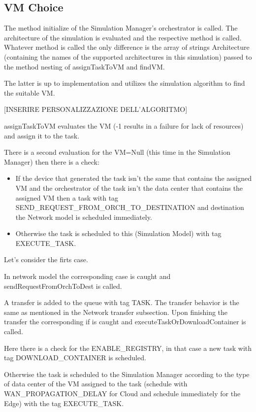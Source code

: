 \documentclass[12pt]{report}
\begin{document}
\subsection*{VM Choice}
The method initialize of the Simulation Manager's orchestrator is called. The architecture of the simulation is evaluated and the respective method is called. Whatever method is called the only difference is the array of strings Architecture (containing the names of the supported architectures in this simulation) passed to the method nesting of assignTaskToVM and findVM.

The latter is up to implementation and utilizes the simulation algorithm to find the suitable VM.

[INSERIRE PERSONALIZZAZIONE DELL'ALGORITMO]

assignTaskToVM evaluates the VM (-1 results in a failure for lack of resources) and assign it to the task. 

\vspace{0.5cm}
There is a second evaluation for the VM=Null (this time in the Simulation Manager) then there is a check:
\begin{itemize}
	\item If the device that generated the task isn't the same that contains the assigned VM and the orchestrator of the task isn't the data center that contains the assigned VM then a task with tag SEND\_REQUEST\_FROM\_ORCH\_TO\_DESTINATION and destination the Network model is scheduled immediately.
	\item Otherwise the task is scheduled to this (Simulation Model) with tag EXECUTE\_TASK.
\end{itemize}
Let's consider the firts case.

In network model the corresponding case is caught and sendRequestFromOrchToDest is called.

A transfer is added to the queue with tag TASK. The transfer behavior is the same as mentioned in the Network transfer subsection. %
Upon finishing the transfer the corresponding if is caught and executeTaskOrDownloadContainer is called.

Here there is a check for the ENABLE\_REGISTRY, in that case a new task with tag DOWNLOAD\_CONTAINER is scheduled.

Otherwise the task is scheduled to the Simulation Manager according to the type of data center of the VM assigned to the task (schedule with WAN\_PROPAGATION\_DELAY for Cloud and schedule immediately for the Edge) with the tag EXECUTE\_TASK.
\end{document}
